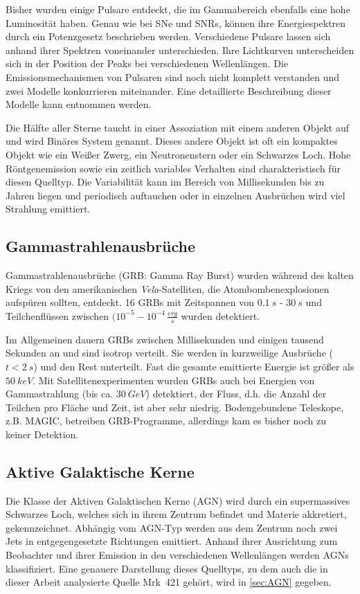 Bisher wurden einige Pulsare entdeckt, die im Gammabereich ebenfalls eine hohe Luminosität haben.
Genau wie bei SNe und SNRs, können ihre Energiespektren durch ein Potenzgesetz beschrieben werden.
Verschiedene Pulsare lassen sich anhand ihrer Spektren voneinander unterschieden.
Ihre Lichtkurven unterscheiden sich in der Position der Peaks bei verschiedenen Wellenlängen.
Die Emissionsmechanismen von Pulsaren sind noch nicht komplett verstanden und zwei Modelle konkurrieren miteinander.
Eine detaillierte Beschreibung dieser Modelle kann \cite{Weekes} entnommen werden.

Die Hälfte aller Sterne taucht in einer Assoziation mit einem anderen Objekt auf und wird Binäres System genannt.
Dieses andere Objekt ist oft ein kompaktes Objekt wie ein Weißer Zwerg, ein Neutronenstern oder ein Schwarzes Loch.
Hohe Röntgenemission sowie ein zeitlich variables Verhalten sind charakteristisch für diesen Quelltyp.
Die Variabilität kann im Bereich von Millisekunden bis zu Jahren liegen und periodisch auftauchen oder in einzelnen Ausbrüchen wird viel Strahlung emittiert.\cite{Weekes}


\subsection{Gammastrahlenausbrüche}
Gammastrahlenausbrüche (GRB: Gamma Ray Burst) wurden während des kalten Kriegs von den amerikanischen \textit{Vela}-Satelliten, die Atombombenexplosionen aufspüren sollten, entdeckt.
16 GRBs mit Zeitspannen von $\SI{0,1}{s}$ - $\SI{30}{s}$ und Teilchenflüssen zwischen $(10^{-5}-10^{-4}\,\frac{\si{erg}}{\si{s}}$ wurden detektiert.

Im Allgemeinen dauern GRBs zwischen Millisekunden und einigen tausend Sekunden an und sind isotrop verteilt.
Sie werden in kurzweilige Ausbrüche ($t<\SI{2}{s}$) und den Rest unterteilt.
Fast die gesamte emittierte Energie ist größer als $\SI{50}{keV}$.
Mit Satellitenexperimenten wurden GRBs auch bei Energien von Gammastrahlung (bis ca. $\SI{30}{GeV}$) detektiert, der Fluss, d.h. die Anzahl der Teilchen pro Fläche und Zeit, ist aber sehr niedrig.
Bodengebundene Teleskope, z.B. MAGIC, betreiben GRB-Programme, allerdings kam es bisher noch zu keiner Detektion.\cite{Weekes}


\subsection{Aktive Galaktische Kerne}
Die Klasse der Aktiven Galaktischen Kerne (AGN) wird durch ein supermassives Schwarzes Loch, welches sich in ihrem Zentrum befindet und Materie akkretiert, gekennzeichnet.
Abhängig vom AGN-Typ werden aus dem Zentrum noch zwei Jets in entgegengesetzte Richtungen emittiert.  
Anhand ihrer Ausrichtung zum Beobachter und ihrer Emission in den verschiedenen Wellenlängen werden AGNs klassifiziert. 
Eine genauere Darstellung dieses Quelltyps, zu dem auch die in dieser Arbeit analysierte Quelle Mrk~421 gehört, wird in \autoref{sec:AGN} gegeben.

